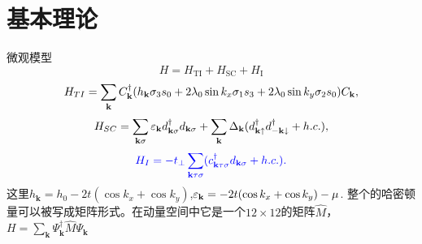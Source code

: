 \documentclass[10pt,aspectratio=169]{beamer} %
\begin{document}
\section{基本理论}
\begin{frame}{微观模型}
\begin{equation}
H=H_\mathrm{TI}+H_\mathrm{SC}+H_\mathrm{I}\label{ham}
\end{equation}
\begin{equation}
\begin{aligned}
H_{TI} =\sum_{{\bf k}}C_{{\bf k}}^\dagger (h_\mathbf{k}\sigma_3s_0+2\lambda_{0}\sin k_x\sigma_1s_3+2\lambda_0\sin k_y\sigma_2 s_0)C_{{\bf k}},
\end{aligned}
\end{equation}
\begin{equation}
H_{SC}=\sum_{{\bf k}\sigma}\varepsilon_{\bf k}d^\dagger_{{\bf k}\sigma}d_{{\bf k}\sigma}+\sum_{{\bf k}}\Delta_{\bf k}(d^\dagger_{{\bf k}\uparrow}d^\dagger_{{-\bf k}\downarrow}+h.c.),
\end{equation}
\begin{equation}
{\color{blue}H_{I}=-t_\perp \sum_{{\bf k}\tau\sigma}(c_{{\bf k}\tau\sigma}^\dagger d_{{\bf k}\sigma}+h.c.).}
\end{equation}
这里$h_\mathbf{k}=h_0-2t(\cos k_x+\cos k_y)$,$\varepsilon_{\bf k}=-2t(\cos k_x+\cos k_y)-\mu$.
整个的哈密顿量可以被写成矩阵形式。在动量空间中它是一个$12\times 12$的矩阵$\hat{M}$，$H=\sum_{\mathbf{k}}\Psi_\mathbf{k}^\dagger\hat{M}\Psi_\mathbf{k}$
\end{frame}
\end{document}
